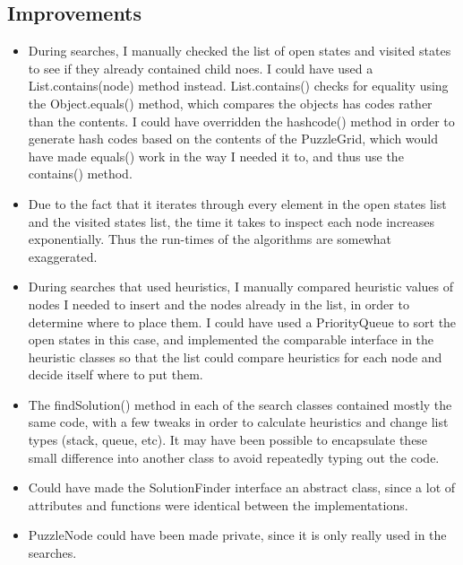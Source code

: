 \documentclass[12pt]{article}
\begin{document}
\subsection{Improvements}
\begin{itemize}
	\item During searches, I manually checked the list of open states and visited states to see if they already contained child noes. I could have used a List.contains(node) method instead. List.contains() checks for equality using the Object.equals() method, which compares the objects has codes rather than the contents. I could have overridden the hashcode() method in order to generate hash codes based on the contents of the PuzzleGrid, which would have made equals() work in the way I needed it to, and thus use the contains() method. 
	\item Due to the fact that it iterates through every element in the open states list and the visited states list, the time it takes to inspect each node increases exponentially. Thus the run-times of the algorithms are somewhat exaggerated.
	\item During searches that used heuristics, I manually compared heuristic values of nodes I needed to insert and the nodes already in the list, in order to determine where to place them. I could have used a PriorityQueue to sort the open states in this case, and implemented the comparable interface in the heuristic classes so that the list could compare heuristics for each node and decide itself where to put them.
	\item The findSolution() method in each of the search classes contained mostly the same code, with a few tweaks in order to calculate heuristics and change list types (stack, queue, etc). It may have been possible to encapsulate these small difference into another class to avoid repeatedly typing out the code.
	\item Could have made the SolutionFinder interface an abstract class, since a lot of attributes and functions were identical between the implementations.
	\item PuzzleNode could have been made private, since it is only really used in the searches.
\end{itemize}
\end{document}
